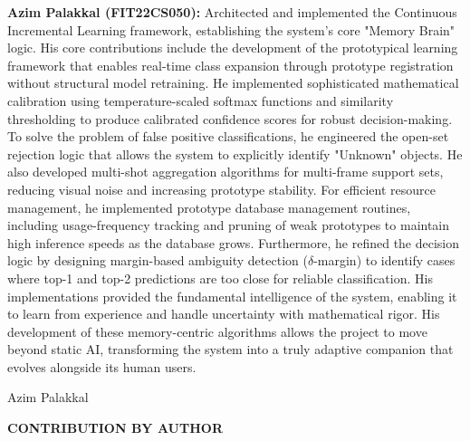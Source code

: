 \documentclass[12pt,a4paper]{report}
\begin{document}
\noindent
\textbf{Azim Palakkal (FIT22CS050):} Architected and implemented the Continuous Incremental Learning framework, establishing the system's core "Memory Brain" logic. His core contributions include the development of the prototypical learning framework that enables real-time class expansion through prototype registration without structural model retraining. He implemented sophisticated mathematical calibration using temperature-scaled softmax functions and similarity thresholding to produce calibrated confidence scores for robust decision-making. To solve the problem of false positive classifications, he engineered the open-set rejection logic that allows the system to explicitly identify "Unknown" objects. He also developed multi-shot aggregation algorithms for multi-frame support sets, reducing visual noise and increasing prototype stability. For efficient resource management, he implemented prototype database management routines, including usage-frequency tracking and pruning of weak prototypes to maintain high inference speeds as the database grows. Furthermore, he refined the decision logic by designing margin-based ambiguity detection ($\delta$-margin) to identify cases where top-1 and top-2 predictions are too close for reliable classification. His implementations provided the fundamental intelligence of the system, enabling it to learn from experience and handle uncertainty with mathematical rigor. His development of these memory-centric algorithms allows the project to move beyond static AI, transforming the system into a truly adaptive companion that evolves alongside its human users.

\vspace{3cm}
\begin{flushright}
    Azim Palakkal
\end{flushright}

\newpage
\begin{center}
    \textbf{\large CONTRIBUTION BY AUTHOR}
\end{center}
\vspace{0.5cm}
\end{document}
